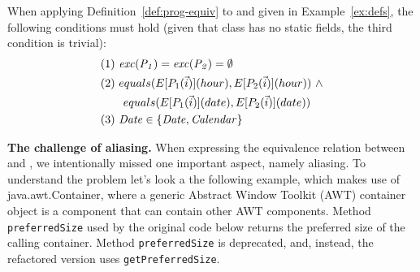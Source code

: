 \documentclass[sigconf,review,anonymous]{acmart}
\begin{document}
\begin{example}\label{ex:equiv}
  When applying Definition~\ref{def:prog-equiv} to  and  given in Example~\ref{ex:defs},
  the following conditions must hold (given that class  has no static fields, the third condition is trivial):
\[
\begin{aligned}
      & (1)~ \var{exc(P_1)}=\var{exc(P_2)} =\emptyset\\
      & (2)~ equals(E[P_1(\vec{i})](hour), E[P_2(\vec{i})](hour)) ~ \wedge\\ %
      & \qquad equals(E[P_1(\vec{i})](date), E[P_2(\vec{i})](date))\\
& (3)~  \var{Date} \in \{\var{Date}, \var{Calendar}\}
    \end{aligned}
    \]

 
    
\end{example}


{\bf The challenge of aliasing.}
%
When expressing the equivalence relation between  and , we
intentionally missed one important aspect, namely aliasing.  To understand
the problem let's look a the following example, which makes use of
java.awt.Container, where a generic Abstract Window Toolkit (AWT) container
object is a component that can contain other AWT components.  Method
\lstinline[breaklines=true]{preferredSize} used by the original code below returns the preferred
size of the calling container. Method
\lstinline[breaklines=true]{preferredSize} is deprecated, and, instead, the refactored version
uses \lstinline[breaklines=true]{getPreferredSize}.

\end{document}
